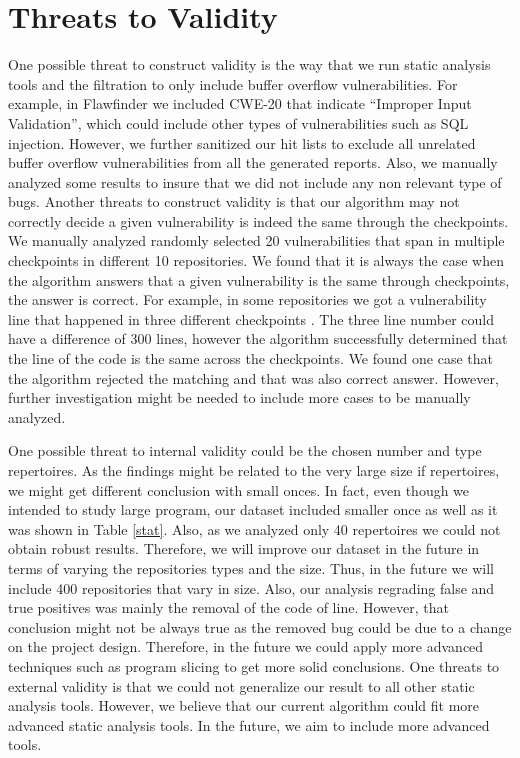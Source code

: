 \section{Threats to Validity \label{ttv}}
One possible threat to construct validity is the way that we run static analysis tools and the filtration to only include buffer overflow vulnerabilities. For example, in Flawfinder we included  CWE-20 that indicate ``Improper Input Validation'', which could include other types of vulnerabilities such as SQL injection. However, we further sanitized our hit lists to exclude all unrelated buffer overflow vulnerabilities from all the generated reports. Also,  we manually  analyzed some results to insure that we did not include any non relevant type of bugs. Another threats to construct validity is that our algorithm may not correctly decide a given vulnerability is indeed the same through the checkpoints. We manually analyzed randomly selected 20 vulnerabilities that span in multiple checkpoints in different 10 repositories. We found that it is always the case when the algorithm answers that a given vulnerability is the same through checkpoints, the answer is correct. For example, in some repositories we got a vulnerability line that happened in three different checkpoints . The three line number could have a difference of 300 lines, however the algorithm successfully determined that the line of the code is the same across the checkpoints. We found one  case that the algorithm rejected the matching and that was also correct answer. However, further investigation might be needed to include more cases to be manually  analyzed. 

One possible threat to internal validity could be the chosen number and type  repertoires. As the findings might be related to the very large size if repertoires, we might get different conclusion with small onces. In fact, even though we intended to study large program,  our dataset included  smaller once as well as it was shown in Table \ref{stat}. Also, as we analyzed only 40 repertoires we could not obtain  robust results. Therefore, we will improve our dataset in the future in terms of varying the repositories types and the size. Thus, in the future we will include 400 repositories that vary in size. Also, our analysis regrading false and true positives was mainly the removal of the code of line. However, that conclusion  might not be always true as the removed bug could be due to a change on the project design. Therefore, in the future we could apply more advanced techniques such as program slicing to get more solid conclusions. One threats to external validity is that we could not generalize our result to all other static analysis tools. However, we believe that our current algorithm could fit more advanced  static analysis tools.  In the future, we aim to include more advanced tools. 
 